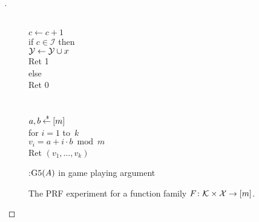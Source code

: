 \begin{proof}[]
\begin{figure}
\centering
{}
{
%
{
\\
$c \gets c+1$\\
if $c \in \mathcal{I}$ then\\
\nudge ${\cal Y} \gets {\cal Y} \cup {x}$\\
\nudge Ret 1\\
else\\
\nudge Ret 0 \\\\
%
\\
$a,b {\:\stackrel{{\scriptscriptstyle \hspace{0.2em}\$}} {\leftarrow}\:} [m]$\\
for $i = 1$ to~$k$\\
\nudge $v_i = a+i \cdot b \bmod m$\\
Ret $\left(v_1,\ldots,v_k\right)$
}
}
\caption{:$\text{G5}(A)$ in game playing argument}\label{fig:game5}
\end{figure}

\begin{figure}
\centering
{}
\caption{The PRF experiment for a function family $F \colon {\cal K}
  \times {\cal X} \to [m]$. }\label{fig:prf}
\end{figure}


\end{proof}
